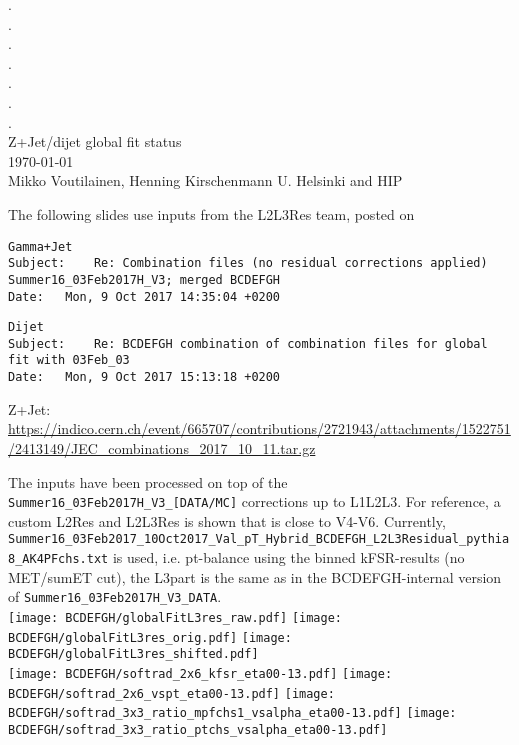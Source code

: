 \documentclass[landscape,10pt]{beamer} %
\begin{document}
\begin{centering}
{. }\\
{. }\\
{. }\\
{. }\\
{. }\\
{. }\\
{. }\\
Z+Jet/dijet global fit status\\
\today\\
Mikko Voutilainen, Henning Kirschenmann
U. Helsinki and HIP\\
\end{centering}
\newpage

The following slides use inputs from the L2L3Res team, posted on 
\begin{verbatim}
Gamma+Jet
Subject: 	Re: Combination files (no residual corrections applied) Summer16_03Feb2017H_V3; merged BCDEFGH
Date: 	Mon, 9 Oct 2017 14:35:04 +0200
\end{verbatim}

\begin{verbatim}
Dijet
Subject: 	Re: BCDEFGH combination of combination files for global fit with 03Feb_03
Date: 	Mon, 9 Oct 2017 15:13:18 +0200
\end{verbatim}

Z+Jet: 
\url{https://indico.cern.ch/event/665707/contributions/2721943/attachments/1522751/2413149/JEC_combinations_2017_10_11.tar.gz}

The inputs have been processed on top of the \verb|Summer16_03Feb2017H_V3_[DATA/MC]| corrections up to L1L2L3. For reference, a custom L2Res and L2L3Res is shown that is close to V4-V6. Currently, \verb|Summer16_03Feb2017_10Oct2017_Val_pT_Hybrid_BCDEFGH_L2L3Residual_pythia8_AK4PFchs.txt| is used, i.e. pt-balance using the binned kFSR-results (no MET/sumET cut), the L3part is the same as in the BCDEFGH-internal version of  \verb|Summer16_03Feb2017H_V3_DATA|. \\

\newpage
\texttt{[image: BCDEFGH/globalFitL3res\_raw.pdf]}
\texttt{[image: BCDEFGH/globalFitL3res\_orig.pdf]}
\texttt{[image: BCDEFGH/globalFitL3res\_shifted.pdf]}\\
\texttt{[image: BCDEFGH/softrad\_2x6\_kfsr\_eta00-13.pdf]}
\texttt{[image: BCDEFGH/softrad\_2x6\_vspt\_eta00-13.pdf]}
\texttt{[image: BCDEFGH/softrad\_3x3\_ratio\_mpfchs1\_vsalpha\_eta00-13.pdf]}
\texttt{[image: BCDEFGH/softrad\_3x3\_ratio\_ptchs\_vsalpha\_eta00-13.pdf]}\\
\end{document}
